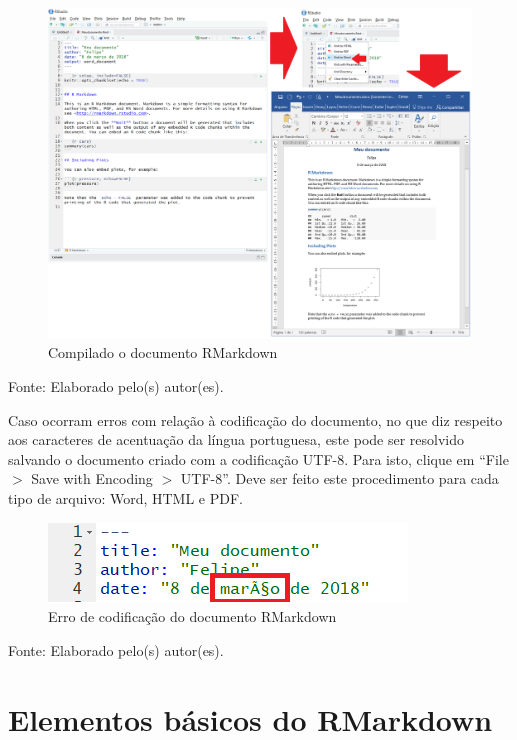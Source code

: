 \documentclass[12pt,brazil,oneside]{book}
\begin{document}
\begin{figure}[H]

{\centering \includegraphics[width=0.8\linewidth]{compilar} 

}

\caption{Compilado o documento RMarkdown}\label{fig:compil}
\end{figure}

Fonte: Elaborado pelo(s) autor(es).

Caso ocorram erros com relação à codificação do documento, no que diz
respeito aos caracteres de acentuação da língua portuguesa, este pode
ser resolvido salvando o documento criado com a codificação UTF-8. Para
isto, clique em ``File \(>\) Save with Encoding \(>\) UTF-8''. Deve ser
feito este procedimento para cada tipo de arquivo: Word, HTML e PDF.

\begin{figure}[H]

{\centering \includegraphics[width=0.8\linewidth]{errocodif} 

}

\caption{Erro de codificação do documento RMarkdown}\label{fig:errocodif}
\end{figure}

Fonte: Elaborado pelo(s) autor(es).

\hypertarget{elementos-basicos-do-rmarkdown}{%
\section{Elementos básicos do
RMarkdown}\label{elementos-basicos-do-rmarkdown}}
\end{document}
